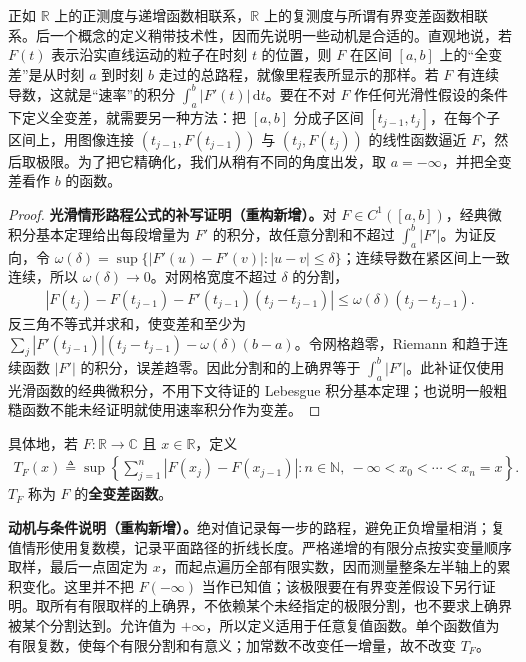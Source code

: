 \documentclass[../../main.tex]{subfiles}%
\begin{document}
正如 $\mathbb R$ 上的正测度与递增函数相联系，$\mathbb R$ 上的复测度与所谓有界变差函数相联系。后一个概念的定义稍带技术性，因而先说明一些动机是合适的。直观地说，若 $F(t)$ 表示沿实直线运动的粒子在时刻 $t$ 的位置，则 $F$ 在区间 $[a,b]$ 上的“全变差”是从时刻 $a$ 到时刻 $b$ 走过的总路程，就像里程表所显示的那样。若 $F$ 有连续导数，这就是“速率”的积分 $\int_a^b|F'(t)|\,\mathrm dt$。要在不对 $F$ 作任何光滑性假设的条件下定义全变差，就需要另一种方法：把 $[a,b]$ 分成子区间 $[t_{j-1},t_j]$，在每个子区间上，用图像连接 $(t_{j-1},F(t_{j-1}))$ 与 $(t_j,F(t_j))$ 的线性函数逼近 $F$，然后取极限。为了把它精确化，我们从稍有不同的角度出发，取 $a=-\infty$，并把全变差看作 $b$ 的函数。
\begin{proof}
\textbf{光滑情形路程公式的补写证明（重构新增）。}对 $F\in C^1([a,b])$，经典微积分基本定理给出每段增量为 $F'$ 的积分，故任意分割和不超过 $\int_a^b|F'|$。为证反向，令 $\omega(\delta)=\sup\{|F'(u)-F'(v)|:|u-v|\le\delta\}$；连续导数在紧区间上一致连续，所以 $\omega(\delta)\to0$。对网格宽度不超过 $\delta$ 的分割，
\begin{align*}
\left|F(t_j)-F(t_{j-1})-F'(t_{j-1})(t_j-t_{j-1})\right|
\le\omega(\delta)(t_j-t_{j-1}).
\end{align*}
反三角不等式并求和，使变差和至少为 $\sum_j|F'(t_{j-1})|(t_j-t_{j-1})-\omega(\delta)(b-a)$。令网格趋零，Riemann 和趋于连续函数 $|F'|$ 的积分，误差趋零。因此分割和的上确界等于 $\int_a^b|F'|$。此补证仅使用光滑函数的经典微积分，不用下文待证的 Lebesgue 积分基本定理；也说明一般粗糙函数不能未经证明就使用速率积分作为变差。
\end{proof}

\begin{definition}[全变差函数]\label{definition:ch03-total-variation-function}
具体地，若 $F:\mathbb R\to\mathbb C$ 且 $x\in\mathbb R$，定义
\begin{align*}
T_F(x)\triangleq\sup\left\{\sum_{j=1}^n|F(x_j)-F(x_{j-1})|:
n\in\mathbb N,\ -\infty<x_0<\cdots<x_n=x\right\}.
\end{align*}
$T_F$ 称为 $F$ 的\textbf{全变差函数}。
\end{definition}
\begin{remark}
\textbf{动机与条件说明（重构新增）。}绝对值记录每一步的路程，避免正负增量相消；复值情形使用复数模，记录平面路径的折线长度。严格递增的有限分点按实变量顺序取样，最后一点固定为 $x$，而起点遍历全部有限实数，因而测量整条左半轴上的累积变化。这里并不把 $F(-\infty)$ 当作已知值；该极限要在有界变差假设下另行证明。取所有有限取样的上确界，不依赖某个未经指定的极限分割，也不要求上确界被某个分割达到。允许值为 $+\infty$，所以定义适用于任意复值函数。单个函数值为有限复数，使每个有限分割和有意义；加常数不改变任一增量，故不改变 $T_F$。
\end{remark}
\end{document}
